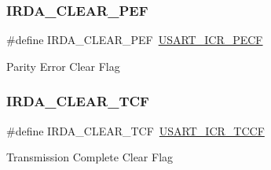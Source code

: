 \subsubsection{\texorpdfstring{I\+R\+D\+A\+\_\+\+C\+L\+E\+A\+R\+\_\+\+P\+EF}{IRDA\_CLEAR\_PEF}}
{\footnotesize\ttfamily \#define I\+R\+D\+A\+\_\+\+C\+L\+E\+A\+R\+\_\+\+P\+EF~\hyperlink{group___peripheral___registers___bits___definition_ga404185136eb68f679e82e0187d66e411}{U\+S\+A\+R\+T\+\_\+\+I\+C\+R\+\_\+\+P\+E\+CF}}

Parity Error Clear Flag \mbox{\label{group___i_r_d_a___i_t___c_l_e_a_r___flags_ga90c7c32218dc7e62b918168b147ae268}} 
\subsubsection{\texorpdfstring{I\+R\+D\+A\+\_\+\+C\+L\+E\+A\+R\+\_\+\+T\+CF}{IRDA\_CLEAR\_TCF}}
{\footnotesize\ttfamily \#define I\+R\+D\+A\+\_\+\+C\+L\+E\+A\+R\+\_\+\+T\+CF~\hyperlink{group___peripheral___registers___bits___definition_gacf92ea54425a962dde662b10b61d0250}{U\+S\+A\+R\+T\+\_\+\+I\+C\+R\+\_\+\+T\+C\+CF}}

Transmission Complete Clear Flag 